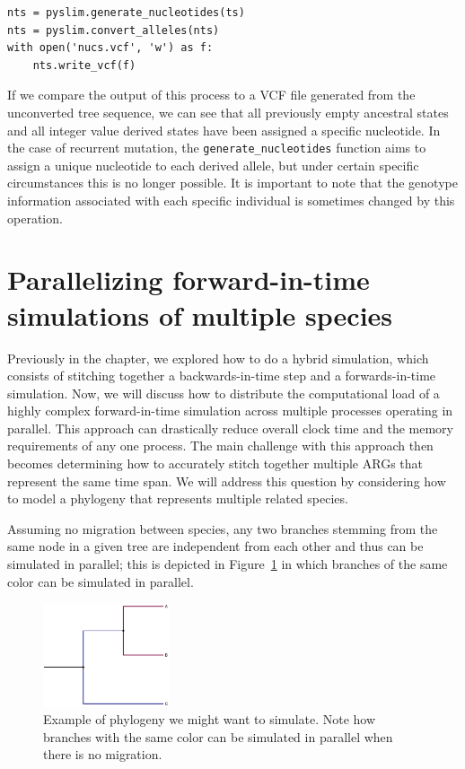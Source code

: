 \documentclass[12pt]{article}
\begin{document}
\begin{verbatim}
nts = pyslim.generate_nucleotides(ts)
nts = pyslim.convert_alleles(nts)
with open('nucs.vcf', 'w') as f:
    nts.write_vcf(f)
\end{verbatim}

If we compare the output of this process to a VCF file generated from the unconverted tree sequence, we can see that all previously empty ancestral states and
all integer value derived states have been assigned a specific nucleotide. In the case of recurrent mutation, the \verb|generate_nucleotides| function aims to assign a unique
nucleotide to each derived allele, but
under certain specific circumstances
this is no longer possible. It is important to note that the genotype information associated with each specific individual is
sometimes changed
by this operation.

\section*{Parallelizing forward-in-time simulations of multiple species}

Previously in the chapter, we explored how to do a hybrid simulation, which consists of stitching together a backwards-in-time step and a forwards-in-time simulation.
Now, we will discuss how to distribute the computational load of a highly complex forward-in-time simulation across multiple processes operating in parallel.
This approach can drastically reduce overall clock time and the memory requirements of any one process. The main challenge with this approach then becomes
determining how to accurately stitch together multiple ARGs that represent the same time span. We will address this question by considering how to model a phylogeny
that represents multiple related species.

Assuming no migration between species, any two branches stemming from the same node in a given tree are independent from each other and
thus can be simulated in parallel; this is depicted in Figure~\ref{fig:phylo} in which branches of the same color can be simulated in parallel.

\begin{figure}[h!]
    \centering
     \includegraphics[width=0.33\textwidth]{./code/parallelizing_phylogeny/phylo.pdf}
     \caption{Example of phylogeny we might want to simulate. Note how branches with the same color can be simulated in parallel when there is no migration.}
     \label{fig:phylo}
\end{figure}
\end{document}
